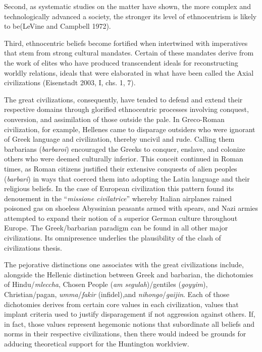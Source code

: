 Second, as systematic studies on the matter have shown, the more complex and technologically advanced a society, the stronger its level of ethnocentrism is likely to be(LeVine and Campbell 1972). 

Third, ethnocentric beliefs become fortified when intertwined with imperatives that stem from strong cultural mandates. Certain of these mandates derive from the work of elites who have produced transcendent ideals for reconstructing worldly relations, ideals that were elaborated in what have been called the Axial civilizations (Eisenstadt 2003, I, chs. 1, 7).

The great civilizations, consequently, have tended to defend and extend their respective domains through glorified ethnocentric processes involving conquest, conversion, and assimilation of those outside the pale. In Greco-Roman civilization, for example, Hellenes came to disparage outsiders who were ignorant of Greek language and civilization, thereby uncivil and rude. Calling them barbarians (\emph{barbaroi}) encouraged the Greeks to conquer, enslave, and colonize others who were deemed culturally inferior. This conceit continued in Roman times, as Roman citizens justified their extensive conquests of alien peoples (\emph{barbari}) in ways that coerced them into adopting the Latin language and their religious beliefs. In the case of European civilization this pattern found its denouement in the ``\emph{missione civilatrice}'' whereby Italian airplanes rained poisoned gas on shoeless Abyssinian peasants armed with spears, and Nazi armies attempted to expand their notion of a superior German culture throughout Europe. The Greek/barbarian paradigm can be found in all other major civilizations. Its omnipresence underlies the plausibility of the clash of civilizations thesis. 

The pejorative distinctions one associates with the great civilizations include, alongside the Hellenic distinction between Greek and barbarian, the dichotomies of Hindu/\emph{mleccha}, Chosen People (\emph{am segulah})/gentiles (\emph{goyyim}), Christian/pagan, \emph{umma}/\emph{fakir} (infidel),and \emph{nihongo}/\emph{gaijin}. Each of those dichotomies derives from certain core values in each civilization, values that implant criteria used to justify disparagement if not aggression against others. If, in fact, those values represent hegemonic notions that subordinate all beliefs and norms in their respective civilizations, then there would indeed be grounds for adducing theoretical support for the Huntington worldview. 

